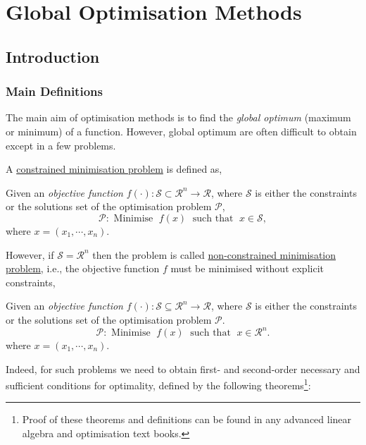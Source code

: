
\chapter{Global Optimisation Methods}\label{Chapter:GlobalOpt}


\section{Introduction}\label{Chapter:GlobalOpt:Section:Introduction}

\subsection{Main Definitions}\label{Chapter:GlobalOpt:Section:Definitions}
The main aim of optimisation methods is to find the {\it global optimum} (maximum or minimum) of a function. However, global optimum are often difficult to obtain except in a few problems. 

A \underline{constrained minimisation problem} is defined as,
\begin{shaded}
   Given an {\it objective function} $f\left(\cdot\right):\mathcal{S}\subset\mathcal{R}^{n}\rightarrow\mathcal{R}$, where $\mathcal{S}$ is either the constraints or the solutions set of the optimisation problem $\mathcal{P}$,
\begin{displaymath}
   \mathcal{P}: \text{ Minimise }\; f(x)\; \text{ such that }\; x\in\mathcal{S}, 
\end{displaymath}
where $x=\left(x_{1},\cdots,x_{n}\right)$.
\end{shaded}

However, if $\mathcal{S}=\mathcal{R}^{n}$ then the problem is called  \underline{non-constrained minimisation problem}, i.e., the objective function $f$ must be minimised without explicit constraints,
\begin{shaded}
   Given an {\it objective function} $f\left(\cdot\right):\mathcal{S}\subseteq\mathcal{R}^{n}\rightarrow\mathcal{R}$, where $\mathcal{S}$ is either the constraints or the solutions set of the optimisation problem $\mathcal{P}$.
\begin{displaymath}
    \mathcal{P}: \text{ Minimise }\; f(x)\; \text{ such that }\; x\in\mathcal{R}^{n}. 
\end{displaymath}
where $x=\left(x_{1},\cdots,x_{n}\right)$.
\end{shaded}
Indeed, for such problems we need to obtain first- and second-order necessary and sufficient conditions for optimality, defined by the following theorems\footnote{Proof of these theorems and definitions can be found in any advanced linear algebra and optimisation text books.}:

